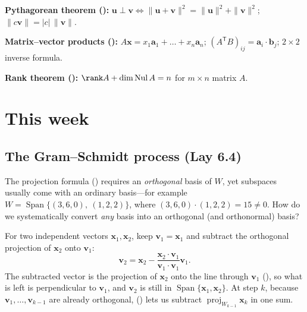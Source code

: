 \documentclass[10pt]{scrartcl}
\newcommand{\vv}[1]{\mathbf{#1}}
\DeclareMathOperator{\spn}{Span}\DeclareMathOperator{\Nul}{Nul}\DeclareMathOperator{\Col}{Col}\DeclareMathOperator{\Row}{Row}\DeclareMathOperator{\tr}{tr}\DeclareMathOperator{\proj}{proj}\DeclareMathOperator{\dist}{dist}
\begin{document}
\begin{enumerate}[label=(W\arabic*),leftmargin=2.8em,itemsep=4pt]
  \ii {}\textbf{Pythagorean theorem ():} $\vv u\perp\vv v \iff \|\vv u+\vv v\|^2=\|\vv u\|^2+\|\vv v\|^2$; $\|c\vv v\|=|c|\,\|\vv v\|$.

  \ii {}\textbf{Matrix--vector products ():} $A\vv x=x_1\vv a_1+\dots+x_n\vv a_n$; $(A^{\mathsf T}B)_{ij}=\vv a_i\cdot\vv b_j$; $2\times2$ inverse formula.

  \ii {}\textbf{Rank theorem ():} $\rank A+\dim\Nul A=n$ for $m\times n$ matrix $A$.
\end{enumerate}

\section{This week}

\subsection{The Gram--Schmidt process (Lay 6.4)}

\begin{qbox}
  The projection formula () requires an \emph{orthogonal} basis of $W$, yet subspaces usually come with an ordinary basis---for example $W=\spn\{(3,6,0),\ (1,2,2)\}$, where $(3,6,0)\cdot(1,2,2)=15\neq 0$. How do we systematically convert \emph{any} basis into an orthogonal (and orthonormal) basis?
\end{qbox}

For two independent vectors $\vv x_1,\vv x_2$, keep $\vv v_1=\vv x_1$ and subtract the orthogonal projection of $\vv x_2$ onto $\vv v_1$:
\[
  \vv v_2 = \vv x_2 - \frac{\vv x_2\cdot\vv v_1}{\vv v_1\cdot\vv v_1}\vv v_1.
\]
The subtracted vector is the projection of $\vv x_2$ onto the line through $\vv v_1$ (), so what is left is perpendicular to $\vv v_1$, and $\vv v_2$ is still in $\spn\{\vv x_1,\vv x_2\}$. At step $k$, because $\vv v_1,\dots,\vv v_{k-1}$ are already orthogonal, () lets us subtract $\proj_{W_{k-1}}\vv x_k$ in one sum.
\end{document}
